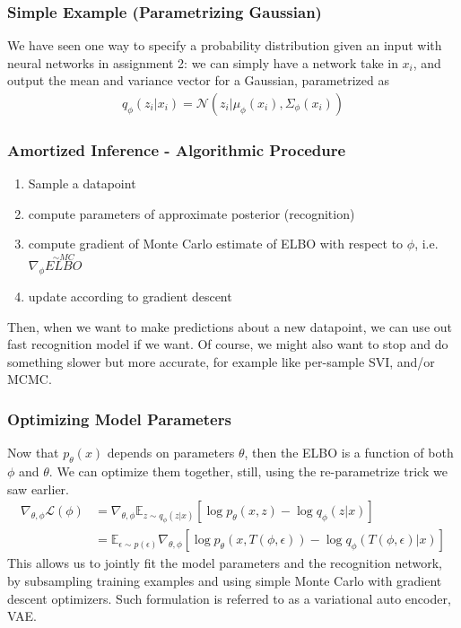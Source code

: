 \documentclass[11pt]{article}
\begin{document}
\subsubsection{Simple Example (Parametrizing Gaussian)}
We have seen one way to specify a probability distribution given an input with neural networks in assignment 2: we can simply have a network take in $x_i$, and output the mean and variance vector for a Gaussian, parametrized as
\begin{align}
    q_{\phi}\left(z_{i} | x_{i}\right)=\mathcal{N}\left(z_{i} | \mu_{\phi}\left(x_{i}\right), \Sigma_{\phi}\left(x_{i}\right)\right)
\end{align}

\subsubsection{Amortized Inference - Algorithmic Procedure}
\begin{enumerate}
    \item Sample a datapoint
    \item compute parameters of approximate posterior (recognition)
    \item compute gradient of Monte Carlo estimate of ELBO with respect to $\phi$, i.e. $\nabla_\phi \overset{\sim MC}{ELBO}$
    \item update according to gradient descent
\end{enumerate}
Then, when we want to make predictions about a new datapoint, we can use out fast recognition model if we want. Of course, we might also want to stop and do something slower but more accurate, for example like per-sample SVI, and/or MCMC.

\subsubsection{Optimizing Model Parameters}
Now that $p_\theta (x)$ depends on parameters $\theta$, then the ELBO is a function of both $\phi$ and $\theta$. We can optimize them together, still, using the re-parametrize trick we saw earlier.
\begin{align}
    \nabla_{\theta, \phi} \mathcal{L}(\phi)
    &=\nabla_{\theta, \phi} \mathbb{E}_{z \sim q_{\phi}(z | x)}\left[\log p_{\theta}(x, z)-\log q_{\phi}(z | x)\right] \\
    &=\mathbb{E}_{\epsilon \sim p(\epsilon)} \nabla_{\theta, \phi}\left[\log p_{\theta}(x, T(\phi, \epsilon))-\log q_{\phi}(T(\phi, \epsilon) | x)\right]
\end{align}
This allows us to jointly fit the model parameters and the recognition network, by subsampling training examples and using simple Monte Carlo with gradient descent optimizers. Such formulation is referred to as a variational auto encoder, VAE.
\end{document}
